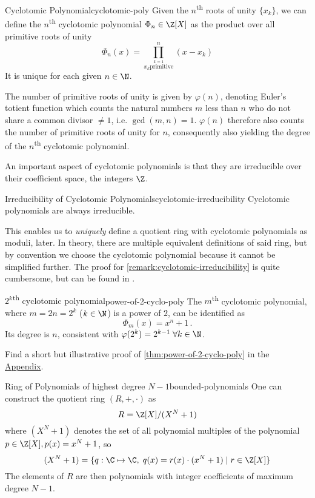 \begin{definition}{Cyclotomic Polynomial}{cyclotomic-poly}
  Given the $n$\textsuperscript{th} roots of unity $\{x_k\}$, we can define the $n$\textsuperscript{th}
  cyclotomic polynomial $\Phi_n \in \Z[X]$ as the product over all primitive roots of unity
  $$\Phi_n(x) = \prod_{\stackrel{k=1}{x_k \mathrm{primitive}}}^{n} (x - x_k)$$
  It is unique for each given $n \in \N$.
\end{definition}
The number of primitive roots of unity is given by $\varphi(n)$, denoting Euler's totient function which counts the natural numbers $m$ less than $n$ who do not share a common divisor $\neq 1$, i.e. $\gcd(m, n) = 1$.
$\varphi(n)$ therefore also counts the number of primitive roots of unity for $n$, consequently also yielding the degree of the $n$\textsuperscript{th} cyclotomic polynomial.

An important aspect of cyclotomic polynomials is that they are irreducible over their coefficient space, the integers $\Z$.
\begin{remark}{Irreducibility of Cyclotomic Polynomials}{cyclotomic-irreducibility}
  Cyclotomic polynomials are always irreducible.
\end{remark}
This enables us to \textit{uniquely} define a quotient ring with cyclotomic polynomials as moduli, later.
In theory, there are multiple equivalent definitions of said ring, but by convention we choose the cyclotomic polynomial because it cannot be simplified further.
The proof for \autoref{remark:cyclotomic-irreducibility} is quite cumbersome, but can be found in \cite{2002-serge-algebra}.

\begin{theorem}{$2^k$\textsuperscript{th} cyclotomic polynomial}{power-of-2-cyclo-poly}
  The $m$\textsuperscript{th} cyclotomic polynomial, where $m = 2n = 2^k$ ($k \in \N$) is a power of $2$, can be identified as
  $$\Phi_{m}(x) = x^{n} + 1\,.$$
  Its degree is $n$, consistent with $\varphi(2^k) = 2^{k-1} \; \forall k \in \N$.
\end{theorem}
Find a short but illustrative proof of \autoref{thm:power-of-2-cyclo-poly} in the \hyperref[chap:appendix]{Appendix}.

\begin{definition}{Ring of Polynomials of highest degree $N-1$}{bounded-polynomials}
  One can construct the quotient ring $(R, +, \cdot)$ as
  $$R = \Z[X] / (X^N + 1)$$
  where $(X^N + 1)$ denotes the set of all polynomial multiples of the polynomial $p \in \Z[X], p(x) = x^N + 1$, so
  $$(X^N+1) = \{q: \C \mapsto \C,\; q(x) = r(x) \cdot (x^N+1) \;|\; r \in \Z[X]\}$$
  The elements of $R$ are then polynomials with integer coefficients of maximum degree $N-1$.
\end{definition}

